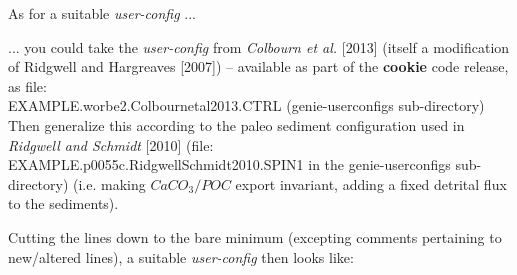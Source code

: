 \vspace{1mm}
As for a suitable \textit{user-config} ...

... you could take the \textit{user-config} from \textit{Colbourn et al.} [2013] (itself a modification of Ridgwell and Hargreaves [2007]) -- available as part of the \textbf{cookie} code release, as file:
\vspace{1mm}
\\\textsf{\footnotesize EXAMPLE.worbe2.Colbournetal2013.CTRL } (\textsf{\footnotesize genie-userconfigs } sub-directory)
\vspace{1mm}
\\Then generalize this according to the paleo sediment configuration used in \textit{Ridgwell and Schmidt} [2010] (file: \textsf{\footnotesize EXAMPLE.p0055c.RidgwellSchmidt2010.SPIN1 } in the \textsf{\footnotesize genie-userconfigs } sub-directory) (i.e. making \(CaCO_{3}/POC\) export invariant, adding a fixed detrital flux to the sediments).

Cutting the lines down to the bare minimum (excepting comments pertaining to new/altered lines), a suitable \textit{user-config} then looks like:

